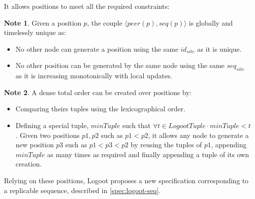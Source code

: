 \documentclass{article}
\newcommand{\tuple}[1]{\langle #1 \rangle}
\theoremstyle{definition}
\newtheorem{note}{Note}
\begin{document}
It allows positions to meet all the required constraints:
\begin{note}
    Given a position $p$, the couple $\tuple{peer(p), seq(p)}$ is globally and timelessly unique as:
    \begin{itemize}
        \item No other node can generate a position using the same $id_{site}$ as it is unique.
        \item No other position can be generated by the same node using the same $seq_{site}$ as it is increasing monotonically with local updates.
    \end{itemize}
\end{note}

\begin{note}
    A dense total order can be created over positions by:
    \begin{itemize}
        \item Comparing theirs tuples using the lexicographical order.
        \item Defining a special tuple, $minTuple$ such that $\forall t \in LogootTuple \cdot minTuple < t$.
        Given two positions $p1, p2$ such as $p1 < p2$, it allows any node to generate a new position $p3$ such as $p1 < p3 < p2$ by reusing the tuples of $p1$, appending $minTuple$ as many times as required and finally appending a tuple of its own creation.
    \end{itemize}
\end{note}

Relying on these positions, Logoot proposes a new specification corresponding to a replicable sequence, described in \autoref{spec:logoot-seq}.
\end{document}
